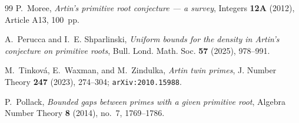 \documentclass[11pt,reqno]{amsart}
\theoremstyle{plain}
\theoremstyle{definition}
\begin{document}
\begin{thebibliography}{99}
P.~Moree,
\emph{Artin's primitive root conjecture --- a survey},
Integers \textbf{12A} (2012), Article A13, 100~pp.

A.~Perucca and I.~E. Shparlinski,
\emph{Uniform bounds for the density in Artin's conjecture on primitive roots},
Bull. Lond. Math. Soc. \textbf{57} (2025), 978--991.

M.~Tinkov\'a, E.~Waxman, and M.~Zindulka,
\emph{Artin twin primes},
J. Number Theory \textbf{247} (2023), 274--304;
\texttt{arXiv:2010.15988}.

P.~Pollack,
\emph{Bounded gaps between primes with a given primitive root},
Algebra Number Theory \textbf{8} (2014), no.~7, 1769--1786.

\end{thebibliography}
\end{document}
